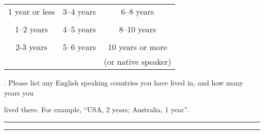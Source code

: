 \begin{table}[htb!]
\begin{tabular}{ccc}
\hspace{2em} 1 year or less & \hspace{1em} 3--4 years & \hspace{1em} 6--8 years \\
& & \\
\hspace{2em} 1--2 years & \hspace{1em} 4--5 years & \hspace{1em} 8--10 years \\
& & \\
\hspace{2em} 2-3 years & \hspace{1em} 5--6 years & \hspace{1em} 10 years or more \\
& & \hspace{1em} (or native speaker) \\

\end{tabular}
\end{table}

\smallskip

. Please list any English speaking countries you have lived in, and how many years you 

lived there. For example, ``USA, 2 years; Australia, 1 year''.

\rule{14cm}{0.4pt}

\rule{14cm}{0.4pt}

